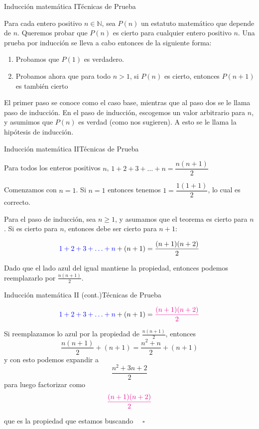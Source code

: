 \documentclass[spanish, c]{beamer}
\begin{document}
\begin{frame}{Inducción matemática I}{Técnicas de Prueba}

    Para cada entero positivo $n \in \mathbb{N}$, sea $P(n)$ un estatuto matemático que depende de $n$.
    Queremos probar que $P(n)$ es cierto para cualquier entero positivo $n$. Una prueba por \alert{inducción} se lleva a cabo entonces de la siguiente forma: \pause

    \begin{enumerate}
        \item Probamos que $P(1)$ es verdadero.\pause
        \item Probamos ahora que para todo $n > 1$, si $P(n)$ es cierto, entonces $P(n+1)$ es también cierto \pause
    \end{enumerate}

    El primer paso se conoce como el \alert{caso base}, mientras que al paso dos se le llama \alert{paso de inducción}.
    En el paso de inducción, escogemos un valor arbitrario para $n$, y asumimos que $P(n)$ es verdad (como nos sugieren). A esto se le llama \alert{la hipótesis de inducción}.
\end{frame}

\begin{frame}{Inducción matemática II}{Técnicas de Prueba}

    \begin{theorem}
        Para todos los enteros positivos $n$, $1 + 2 + 3 + \dots + n = \dfrac{n(n+1)}{2}$
    \end{theorem}

    \bigskip

    Comenzamos con $n=1$. Si $n=1$ entonces tenemos $1 = \dfrac{1(1+1)}{2}$, lo cual es correcto.
    
    Para el paso de inducción, sea $n \geq 1$, y asumamos que el teorema es cierto para $n$.
    Si es cierto para $n$, entonces debe ser cierto para $n+1$:

    $${\color{blue} 1 + 2 + 3 + \dots + n} + (n+1) = \frac{(n+1)(n+2)}{2}$$
    
    Dado que el lado azul del igual mantiene la propiedad, entonces podemos reemplazarlo por $\frac{n(n+1)}{2}$.
\end{frame}

\begin{frame}{Inducción matemática II (cont.)}{Técnicas de Prueba}

    $${\color{blue} 1 + 2 + 3 + \dots + n} + (n+1) = {\color{magenta} \frac{(n+1)(n+2)}{2}}$$

        Si reemplazamos lo azul por la propiedad de $\frac{n(n+1)}{2}$, entonces
        $$\frac{n(n+1)}{2} + (n+1) = \frac{n^2 + n}{2} + (n+1)$$
        y con esto podemos expandir a
        $$\frac{n^2 + 3n + 2}{2}$$
        para luego factorizar como
        $$\color{magenta} \frac{(n+1)(n+2)}{2}$$

        que es la propiedad que estamos buscando $\quad \square$
\end{frame}
\end{document}
